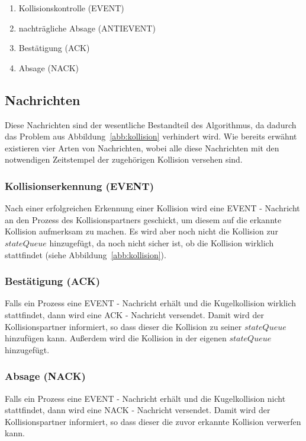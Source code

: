 \documentclass[a4paper, 10pt, openright, parskip, chapterprefix]{scrreprt}
\begin{document}
\begin{enumerate}
\item Kollisionskontrolle (EVENT)
\item nachträgliche Absage (ANTIEVENT)
\item Bestätigung (ACK)
\item Absage (NACK)
\end{enumerate}

\subsection{Nachrichten}

Diese  Nachrichten sind der wesentliche Bestandteil des Algorithmus, da dadurch das Problem aus Abbildung~\ref{abb:kollision} verhindert wird. Wie bereits erwähnt existieren vier Arten von Nachrichten, wobei alle diese Nachrichten mit den notwendigen Zeitstempel der zugehörigen Kollision versehen sind.

\subsubsection*{Kollisionserkennung (EVENT)} 

Nach einer erfolgreichen Erkennung einer Kollision wird eine EVENT - Nachricht an den Prozess des Kollisionspartners geschickt, um
diesem auf die erkannte Kollision aufmerksam zu machen. Es wird aber noch nicht die Kollision zur $stateQueue$ hinzugefügt, da noch 
nicht sicher ist, ob die Kollision wirklich stattfindet (siehe Abbildung~\ref{abb:kollision}). 
\subsubsection*{Bestätigung (ACK)} 

Falls ein Prozess eine EVENT - Nachricht erhält und die Kugelkollision wirklich stattfindet, dann wird eine ACK - Nachricht versendet. Damit wird der Kollisionspartner informiert, so dass dieser die Kollision zu seiner $stateQueue$ hinzufügen kann. Außerdem wird die Kollision in der eigenen $stateQueue$ hinzugefügt.

\subsubsection*{Absage (NACK)} 

Falls ein Prozess eine EVENT - Nachricht erhält und die Kugelkollision nicht stattfindet, dann wird eine NACK - Nachricht versendet. Damit wird der Kollisionspartner informiert, so dass dieser die zuvor erkannte Kollision verwerfen kann.
\end{document}
